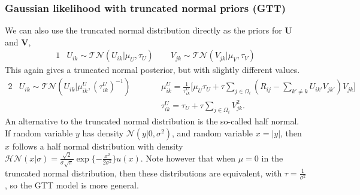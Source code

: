 \documentclass{article}
\newcommand{\U}{\boldsymbol U}
\newcommand{\V}{\boldsymbol V}
\newcommand{\sumOmegai}{\sum_{j \in \Omega_i}}
\newcommand{\sumexclk}{\sum_{k' \neq k}}
\newcommand{\diffexclk}{( R_{ij} - \sumexclk U_{ik'} V_{jk'} ) }
\begin{document}
		\subsubsection{Gaussian likelihood with truncated normal priors (GTT)}
		We can also use the truncated normal distribution directly as the priors for $\U$ and $\V$, 
		\begin{alignat*}{1}
			&U_{ik} \sim \mathcal{TN} ( U_{ik} | \mu_U, \tau_U )		\quad\quad	V_{jk} \sim \mathcal{TN} ( V_{jk} | \mu_V, \tau_V ) 
		\end{alignat*}
		This again gives a truncated normal posterior, but with slightly different values.
		\begin{alignat*}{2}
			& U_{ik} \sim \mathcal{TN} (U_{ik} | \mu^U_{ik}, (\tau^U_{ik})^{-1} )
			\quad\quad &&\mu^U_{ik} = \frac{1}{\tau^U_{ik}} \Bigg[ \mu_U \tau_U + \tau \sumOmegai \diffexclk V_{jk} \Bigg] \\
			& &&\tau^U_{ik} = \tau_U + \tau \sumOmegai V_{jk}^2.
		\end{alignat*}
		An alternative to the truncated normal distribution is the so-called half normal. If random variable $y$ has density $\mathcal{N} (y | 0, \sigma^2 )$, and random variable $x = |y|$, then $x$ follows a half normal distribution with density $\mathcal{HN}(x|\sigma) = \frac{\sqrt{2}}{\sigma \sqrt{\pi}} \exp \lbrace - \frac{x^2}{2\sigma^2} \rbrace u(x) $. Note however that when $\mu = 0$ in the truncated normal distribution, then these distributions are equivalent, with $\tau = \frac{1}{\sigma^2} $, so the GTT model is more general.
		
\end{document}
